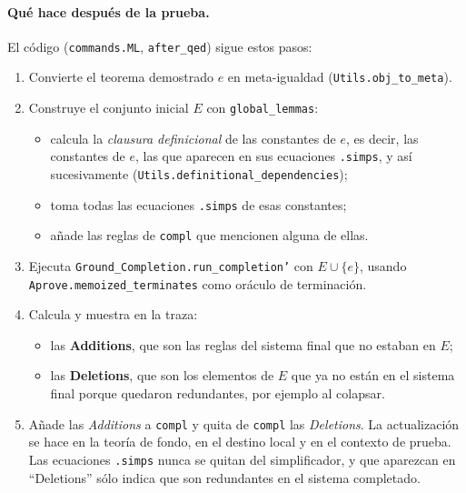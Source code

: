 \documentclass[11pt,a4paper]{article}
\newcommand{\isa}[1]{\texttt{#1}}
\theoremstyle{definition}
\theoremstyle{remark}
\begin{document}
\paragraph{Qué hace después de la prueba.}
El código (\isa{commands.ML}, \isa{after\_qed}) sigue estos pasos:
\begin{enumerate}
  \item Convierte el teorema demostrado $e$ en meta-igualdad
        (\isa{Utils.obj\_to\_meta}).
  \item Construye el conjunto inicial $E$ con \isa{global\_lemmas}:
    \begin{itemize}[nosep]
      \item calcula la \emph{clausura definicional} de las constantes de $e$, es
            decir, las constantes de $e$, las que aparecen en sus ecuaciones
            \isa{.simps}, y así sucesivamente (\isa{Utils.definitional\_dependencies});
      \item toma todas las ecuaciones \isa{.simps} de esas constantes;
      \item añade las reglas de \isa{compl} que mencionen alguna de ellas.
    \end{itemize}
  \item Ejecuta \isa{Ground\_Completion.run\_completion'} con $E \cup \{e\}$, usando
        \isa{Aprove.memoized\_terminates} como oráculo de terminación.
  \item Calcula y muestra en la traza:
        \begin{itemize}[nosep]
          \item las \textbf{Additions}, que son las reglas del sistema final que
                no estaban en $E$;
          \item las \textbf{Deletions}, que son los elementos de $E$ que ya no
                están en el sistema final porque quedaron redundantes, por ejemplo
                al colapsar.
        \end{itemize}
  \item Añade las \emph{Additions} a \isa{compl} y quita de \isa{compl} las
        \emph{Deletions}. La actualización se hace en la teoría de fondo, en el
        destino local y en el contexto de prueba. Las ecuaciones \isa{.simps} nunca
        se quitan del simplificador, y que aparezcan en ``Deletions'' sólo indica
        que son redundantes en el sistema completado.
\end{enumerate}
\end{document}
